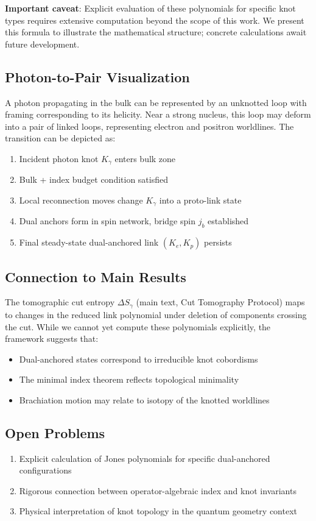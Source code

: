 \documentclass[11pt]{article}
\theoremstyle{plain}
\theoremstyle{definition}
\begin{document}
\textbf{Important caveat}: Explicit evaluation of these polynomials for specific knot types requires extensive computation beyond the scope of this work. We present this formula to illustrate the mathematical structure; concrete calculations await future development.

\subsection{Photon-to-Pair Visualization}
A photon propagating in the bulk can be represented by an unknotted loop with framing corresponding to its helicity. Near a strong nucleus, this loop may deform into a pair of linked loops, representing electron and positron worldlines. The transition can be depicted as:

\begin{enumerate}[label=S\arabic*:]
  \item Incident photon knot $K_\gamma$ enters bulk zone
  \item Bulk + index budget condition satisfied
  \item Local reconnection moves change $K_\gamma$ into a proto-link state
  \item Dual anchors form in spin network, bridge spin $j_b$ established
  \item Final steady-state dual-anchored link $(K_e,K_p)$ persists
\end{enumerate}

\subsection{Connection to Main Results}
The tomographic cut entropy $\Delta S_\gamma$ (main text, Cut Tomography Protocol) maps to changes in the reduced link polynomial under deletion of components crossing the cut. While we cannot yet compute these polynomials explicitly, the framework suggests that:
\begin{itemize}
  \item Dual-anchored states correspond to irreducible knot cobordisms
  \item The minimal index theorem reflects topological minimality
  \item Brachiation motion may relate to isotopy of the knotted worldlines
\end{itemize}

\subsection{Open Problems}
\begin{enumerate}
  \item Explicit calculation of Jones polynomials for specific dual-anchored configurations
  \item Rigorous connection between operator-algebraic index and knot invariants
  \item Physical interpretation of knot topology in the quantum geometry context
\end{enumerate}
\end{document}

